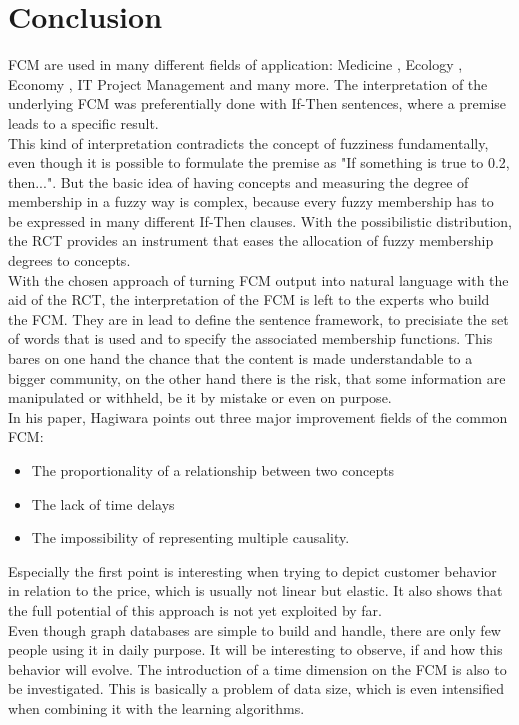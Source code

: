\documentclass[conference]{IEEEtran}
\begin{document}
\section{Conclusion}
FCM are used in many different fields of application: Medicine \cite{georgopoulos2003}, Ecology \cite{ozesmi2004}, Economy \cite{carvalho2004}, IT Project Management \cite{rodriguez2007} and many more. The interpretation of the underlying FCM was preferentially done with If-Then sentences, where a premise leads to a specific result.\\
This kind of interpretation contradicts the concept of fuzziness fundamentally, even though it is possible to formulate the premise as "If something is true to 0.2, then...". But the basic idea of having concepts and measuring the degree of membership in a fuzzy way is complex, because every fuzzy membership has to be expressed in many different If-Then clauses. With the possibilistic distribution, the RCT provides an instrument that eases the allocation of fuzzy membership degrees to concepts.\\
With the chosen approach of turning FCM output into natural language with the aid of the RCT, the interpretation of the FCM is left to the experts who build the FCM. They are in lead to define the sentence framework, to precisiate the set of words that is used and to specify the associated membership functions. This bares on one hand the chance that the content is made understandable to a bigger community, on the other hand there is the risk, that some information are manipulated or withheld, be it by mistake or even on purpose.\\
In his paper, Hagiwara \cite{hagiwara1992} points out three major improvement fields of the common FCM: 
\begin{itemize}
\item The proportionality of a relationship between two concepts
\item The lack of time delays
\item The impossibility of representing multiple causality. 
\end{itemize}
Especially the first point is interesting when trying to depict customer behavior in relation to the price, which is usually not linear but elastic. It also shows that the full potential of this approach is not yet exploited by far.\\
Even though graph databases are simple to build and handle, there are only few people using it in daily purpose. It will be interesting to observe, if and how this behavior will evolve. The introduction of a time dimension on the FCM is also to be investigated. This is basically a problem of data size, which is even intensified when combining it with the learning algorithms.\\
\end{document}
